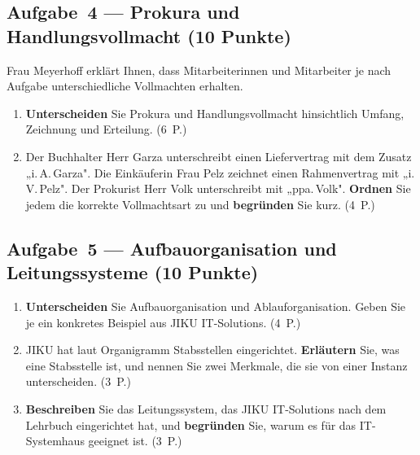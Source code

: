 \documentclass[11pt, a4paper]{article}
\begin{document}
\subsection*{Aufgabe~4 --- Prokura und Handlungsvollmacht (10 Punkte)}

Frau Meyerhoff erklärt Ihnen, dass Mitarbeiterinnen und Mitarbeiter je nach Aufgabe unterschiedliche
Vollmachten erhalten.

\begin{enumerate}[label=(\alph*)]
  \item \textbf{Unterscheiden} Sie Prokura und Handlungsvollmacht hinsichtlich Umfang, Zeichnung
  und Erteilung. \hfill (6~P.)

  \vspace{7cm}

  \item Der Buchhalter Herr Garza unterschreibt einen Liefervertrag mit dem Zusatz „i.\,A.\,Garza".
  Die Einkäuferin Frau Pelz zeichnet einen Rahmenvertrag mit „i.\,V.\,Pelz". Der Prokurist Herr Volk
  unterschreibt mit „ppa.\,Volk". \textbf{Ordnen} Sie jedem die korrekte Vollmachtsart zu und
  \textbf{begründen} Sie kurz. \hfill (4~P.)

  \vspace{5cm}
\end{enumerate}

\subsection*{Aufgabe~5 --- Aufbauorganisation und Leitungssysteme (10 Punkte)}

\begin{enumerate}[label=(\alph*)]
  \item \textbf{Unterscheiden} Sie Aufbauorganisation und Ablauforganisation. Geben Sie je ein
  konkretes Beispiel aus JIKU IT-Solutions. \hfill (4~P.)

  \vspace{4.5cm}

  \item JIKU hat laut Organigramm Stabsstellen eingerichtet. \textbf{Erläutern} Sie, was eine
  Stabsstelle ist, und nennen Sie zwei Merkmale, die sie von einer Instanz unterscheiden. \hfill (3~P.)

  \vspace{4cm}

  \item \textbf{Beschreiben} Sie das Leitungssystem, das JIKU IT-Solutions nach dem Lehrbuch
  eingerichtet hat, und \textbf{begründen} Sie, warum es für das IT-Systemhaus geeignet ist. \hfill (3~P.)

  \vspace{4cm}
\end{enumerate}
\end{document}
